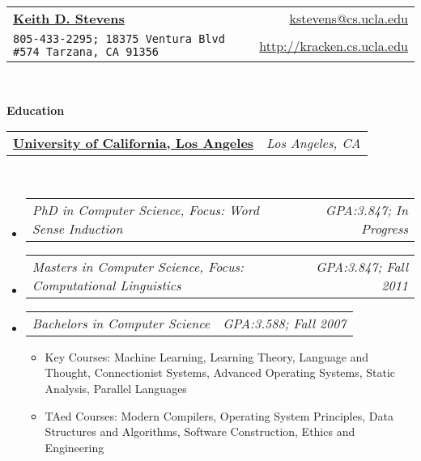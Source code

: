 \documentclass[letterpaper,11pt]{article}
\makeatletter
\newcommand{\resitem}[1]{\item #1 \vspace{-2pt}}
\newcommand{\resheading}[1]{{\large \colorbox{mygrey}{\begin{minipage}{\textwidth}{\textbf{#1 \vphantom{p\^{E}}}}\end{minipage}}}}
\newcommand{\multiHeading}[2]{
\begin{tabular*}{6.5in}{l@{\extracolsep{\fill}}r}
  \textbf{#1} & \textit{#2} \\
\end{tabular*}\vspace{-6pt}}
\newcommand{\multiPart}[2]{
\begin{tabular*}{6.5in}{l@{\extracolsep{\fill}}r}
  \textit{#1} & \textit{#2} \\
\end{tabular*}\vspace{-6pt}}
\makeatother
\begin{document}
\newcommand{\mywebheader}{
\begin{tabular*}{7in}{l@{\extracolsep{\fill}}r}
	\textbf{\href{http://kracken.cs.ucla.edu/}{\LARGE Keith D. Stevens}} & \href{mailto:kstevens@cs.ucla.edu}{kstevens@cs.ucla.edu}\\
	{\footnotesize \texttt{805-433-2295; 18375 Ventura Blvd \#574 Tarzana, CA 91356}} & \href{http://kracken.cs.ucla.edu}{http://kracken.cs.ucla.edu} \\
	\end{tabular*}
\\
\vspace{0.1in}}

\mywebheader

\resheading{Education}
  \multiHeading{\href{http://www.ucla.edu}{University of California, Los Angeles}}
               {Los Angeles, CA}  \\
  \begin{itemize}
    \item \multiPart{PhD in Computer Science, Focus: Word Sense Induction}{GPA:3.847; In Progress}
    \item \multiPart{Masters in Computer Science, Focus: Computational
    Linguistics}{GPA:3.847; Fall 2011}
    \item \multiPart{Bachelors in Computer Science}{GPA:3.588; Fall 2007}
    { \footnotesize
    \begin{itemize}
      \resitem{Key Courses: Machine Learning, Learning Theory, Language and
      Thought, Connectionist Systems, Advanced Operating Systems, Static
      Analysis, Parallel Languages}
      \resitem{TAed Courses: Modern Compilers, Operating System Principles, Data
      Structures and Algorithms, Software Construction, Ethics and Engineering}
    \end{itemize}
    }
  \end{itemize} %
\end{document}

